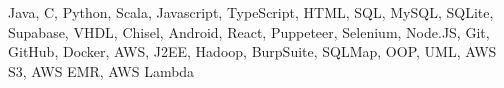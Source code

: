 \noindent
Java, C, Python, Scala, Javascript, TypeScript, HTML, SQL, MySQL, SQLite, Supabase, VHDL, Chisel, Android, React, Puppeteer, Selenium, Node.JS, Git, GitHub, Docker, AWS, J2EE, Hadoop, BurpSuite, SQLMap, OOP, UML, AWS S3, AWS EMR, AWS Lambda